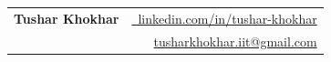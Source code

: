 \documentclass[10pt, letterpaper]{article}
\makeatletter
\newenvironment{header}{
    \setlength{\topsep}{0pt}
    \noindent
    \begin{tabular*}{\textwidth}{@{}l@{\extracolsep{\fill}}r@{}}
}{
    \end{tabular*}
    \par
}
\makeatother
\begin{document}
\newcommand{\AND}{\unskip
    \cleaders\copy\ANDbox\hskip\wd\ANDbox
    \ignorespaces
}
\newsavebox\ANDbox
\sbox\ANDbox{$|$}

\begin{header}
\fontsize{19 pt}{19 pt}\selectfont \textbf{Tushar Khokhar} &
\small
\href{https://linkedin.com/in/tushar-khokhar/}{
      \raisebox{-0.15\height} \faLinkedin\ linkedin.com/in/tushar-khokhar} \\
&
\faEnvelope\enskip \href{mailto:tusharkhokhar.iit@gmail.com}{tusharkhokhar.iit@gmail.com} \\


\end{header}

\vspace{-0.2cm}

\vspace{-0.15cm} %
\end{document}
